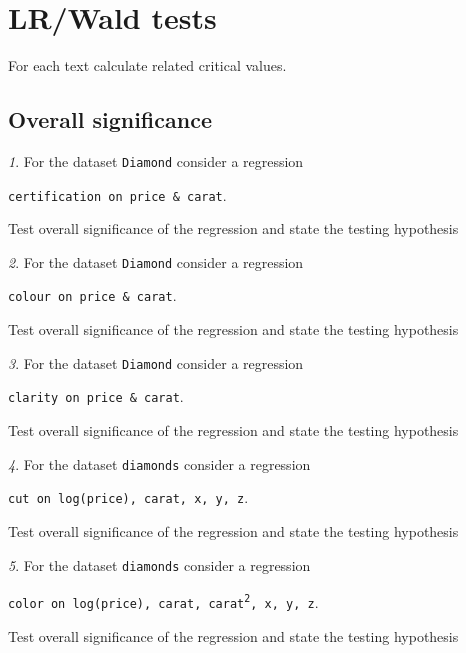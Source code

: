 \documentclass[12pt]{article}
\theoremstyle{remark}
\newtheorem{problem}{}[section]
\begin{document}
\section{LR/Wald tests}

For each text calculate related critical values.

\subsection{Overall significance}

\begin{problem}
For the dataset \texttt{Diamond} consider a regression
\begin{center}
	\texttt{certification on price \& carat}.
\end{center}
Test overall significance of the regression and state the testing hypothesis
\end{problem}

\begin{problem}
For the dataset \texttt{Diamond} consider a regression
\begin{center}
	\texttt{colour on price \& carat}.
\end{center}
Test overall significance of the regression and state the testing hypothesis
\end{problem}

\begin{problem}
For the dataset \texttt{Diamond} consider a regression
\begin{center}
	\texttt{clarity on price \& carat}.
\end{center}
Test overall significance of the regression and state the testing hypothesis
\end{problem}

\begin{problem}
For the dataset \texttt{diamonds} consider a regression
\begin{center}
	\texttt{cut on log(price), carat, x, y, z}.
\end{center}
Test overall significance of the regression and state the testing hypothesis
\end{problem}

\begin{problem}
For the dataset \texttt{diamonds} consider a regression
\begin{center}
	\texttt{color on log(price), carat, carat\textsuperscript{2}, x, y, z}.
\end{center}
Test overall significance of the regression and state the testing hypothesis
\end{problem}
\end{document}
